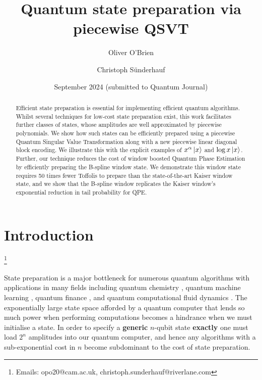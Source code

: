 \documentclass[aps,prx,twocolumn,floatfix,10pt,amssymb,amsfont,amsmath,superscriptaddress,float,nofootinbib,longbibliography,nobalancelastpage]{revtex4-2}
\theoremstyle{empty}
\newcommand\blfootnote[1]{%
  \begingroup
  \renewcommand\thefootnote{}\footnote{#1}%
  \addtocounter{footnote}{-1}%
  \endgroup
}
\renewcommand{\thefootnote}{\alph{footnote}}
\begin{document}
\title{Quantum state preparation via piecewise QSVT}

\author{Oliver O'Brien}
\author{Christoph S{\"u}nderhauf}
\date{September 2024 (submitted to Quantum Journal)}

\begin{abstract}
    Efficient state preparation is essential for implementing efficient quantum algorithms. Whilst several techniques for low-cost state preparation exist, this work facilitates further classes of states, whose amplitudes are well approximated by piecewise polynomials. We show how such states can be efficiently prepared using a piecewise Quantum Singular Value Transformation along with a new piecewise linear diagonal block encoding. We illustrate this with the explicit examples of $x^\alpha\ket{x}$ and $\log x\ket{x}$. Further, our technique reduces the cost of window boosted Quantum Phase Estimation by efficiently preparing the B-spline window state. We demonstrate this window state requires 50 times fewer Toffolis to prepare than the state-of-the-art Kaiser window state, and we show that the B-spline window replicates the Kaiser window's exponential reduction in tail probability for QPE.
\end{abstract}

\maketitle

\tableofcontents

\section{Introduction}
\blfootnote{Emails: opo20@cam.ac.uk, christoph.sunderhauf@riverlane.com}
State preparation is a major bottleneck for numerous quantum algorithms with applications in many fields including quantum chemistry \cite{Aspuru_Guzik_2005,RevModPhys.92.015003, PRXQuantum.2.040332, Huggins:2024hpa}, quantum machine learning \cite{Aaronson:2015scy}, quantum finance \cite{Chakrabarti2021thresholdquantum, Gonzalez-Conde:2021zbv, PhysRevE.103.063302, Dalzell:2022ysw}, and quantum computational fluid dynamics \cite{Lapworth:2022rcw}. The exponentially large state space afforded by a quantum computer that lends so much power when performing computations becomes a hindrance when we must initialise a state. In order to specify a \textbf{generic} $n$-qubit state \textbf{exactly} one must load $2^n$ amplitudes into our quantum computer, and hence any algorithms with a sub-exponential cost in $n$ become subdominant to the cost of state preparation. 
\end{document}
